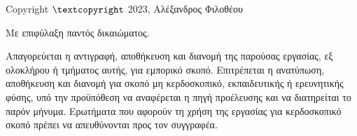 
\vspace*{\fill}
\begin{minipage}{\textwidth} \small\singlespace

  \begin{center}
  Copyright $\textcopyright$ 2023, Αλέξανδρος Φιλοθέου

  Με επιφύλαξη παντός δικαιώματος.
  \end{center}

  Απαγορεύεται η αντιγραφή, αποθήκευση και διανομή της παρούσας εργασίας, εξ
  ολοκλήρου ή τμήματος αυτής, για εμπορικό σκοπό. Επιτρέπεται η ανατύπωση,
  αποθήκευση και διανομή για σκοπό μη κερδοσκοπικό, εκπαιδευτικής ή ερευνητικής
  φύσης, υπό την προϋπόθεση να αναφέρεται η πηγή προέλευσης και να διατηρείται
  το παρόν μήνυμα. Ερωτήματα που αφορούν τη χρήση της εργασίας για κερδοσκοπικό
  σκοπό πρέπει να απευθύνονται προς τον συγγραφέα.
\end{minipage}

\restoregeometry
